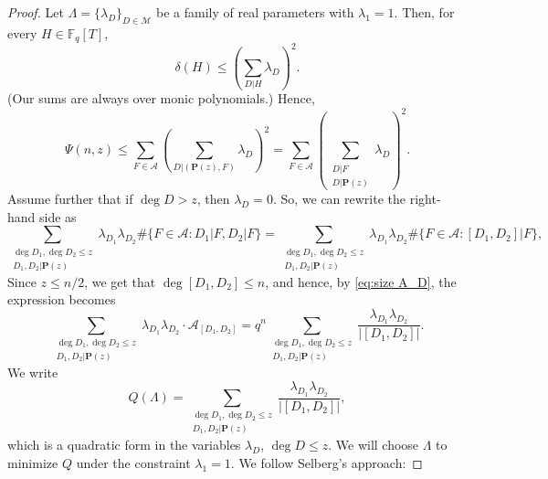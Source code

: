 \documentclass[12pt]{amsart}
\numberwithin{equation}{section}
\theoremstyle{definition}
\theoremstyle{remark}
\newcommand{\FF}{\mathbb{F}}
\newcommand{\ps}[1]{\left( #1 \right)}
\begin{document}
\begin{proof}
        
    Let $\Lambda=\{\lambda_D \}_{D \in \mathcal{M}}$ be a family of real parameters with $\lambda_1=1$. Then, for every $H \in \FF_q[T]$,
    \[
        \delta(H) \leq \ps{\sum_{D|H} \lambda_D}^2.
    \]
    (Our sums are always over monic polynomials.)
    Hence, 
    \[
        \Psi(n,z) \leq \sum_{F\in \mathcal{A}} \ps{\sum_{D|(\mathbf{P}(z),F)} \lambda_D}^2 = \sum_{F\in \mathcal{A}} \ps{\sum_{\substack{D|F \\ D|\mathbf{P}(z)}} \lambda_D}^2.
    \]
    Assume further that if $\deg D > z$, then $\lambda_D=0$. So, we can rewrite the right-hand side as
    \[
        \sum_{\substack{\deg D_1, \deg D_2 \leq z \\ D_1, D_2 | \mathbf{P}(z)}} \lambda_{D_1} \lambda_{D_2} \# \{F \in \mathcal{A}: D_1|F, D_2|F \} = 
        \sum_{\substack{\deg D_1, \deg D_2 \leq z \\ D_1, D_2 | \mathbf{P}(z)}} \lambda_{D_1} \lambda_{D_2} \# \{F \in \mathcal{A}: [D_1,D_2] | F \},
    \]
    Since $z \leq n/2$, we get that  $\deg [D_1,D_2] \leq n$, and hence, by \eqref{eq:size A_D}, the expression becomes
    \[
         \sum_{\substack{\deg D_1, \deg D_2 \leq z \\ D_1, D_2 | \mathbf{P}(z)}} \lambda_{D_1} \lambda_{D_2} \cdot \mathcal{A}_{[D_1,D_2]} = q^n \sum_{\substack{\deg D_1, \deg D_2 \leq z \\ D_1, D_2 | \mathbf{P}(z)}} \frac{\lambda_{D_1} \lambda_{D_2}}{|[D_1,D_2]|}.
    \]
    We write 
    \begin{equation}
        Q(\Lambda) = \sum_{\substack{\deg D_1, \deg D_2 \leq z \\ D_1, D_2 | \mathbf{P}(z)}} \frac{\lambda_{D_1} \lambda_{D_2}}{|[D_1,D_2]|},
    \end{equation}
    which is a quadratic form in the variables $\lambda_D$, $\deg D\leq z$. We will choose $\Lambda$ to minimize $Q$ under the constraint $\lambda_1=1$. We follow Selberg's approach:
    

\end{proof}
\end{document}
